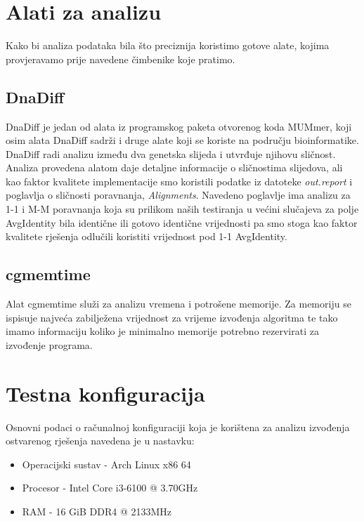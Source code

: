 \documentclass[times, utf8, seminar, numeric]{fer}
\begin{document}
\section{Alati za analizu}
Kako bi analiza podataka bila što preciznija koristimo gotove alate, kojima provjeravamo prije navedene čimbenike koje pratimo.

\subsection{DnaDiff}
DnaDiff je jedan od alata iz programskog paketa otvorenog koda MUMmer, koji osim alata DnaDiff sadrži i druge alate koji se koriste na području bioinformatike. DnaDiff radi analizu između dva genetska slijeda i utvrđuje njihovu sličnost. Analiza provedena alatom daje detaljne informacije o sličnostima slijedova, ali kao faktor kvalitete implementacije smo koristili podatke iz datoteke \emph{out.report} i poglavlja o sličnosti poravnanja, \emph{Alignments}. Navedeno poglavlje ima analizu za 1-1 i M-M poravnanja koja su prilikom naših testiranja u većini slučajeva za polje AvgIdentity bila identične ili gotovo identične vrijednosti pa smo stoga kao faktor kvalitete rješenja odlučili koristiti vrijednost pod 1-1 AvgIdentity.

\subsection{cgmemtime}
Alat cgmemtime služi za analizu vremena i potrošene memorije. Za memoriju se ispisuje najveća zabilježena vrijednost za vrijeme izvođenja algoritma te tako imamo informaciju koliko je minimalno memorije potrebno rezervirati za izvođenje programa.


\section{Testna konfiguracija}
Osnovni podaci o računalnoj konfiguraciji koja je korištena za analizu izvođenja ostvarenog rješenja navedena je u nastavku:
\renewcommand{\labelitemi}{$\bullet$}
\begin{itemize}
	\item Operacijski sustav - Arch Linux x86 64
	\item Procesor - Intel Core i3-6100 @ 3.70GHz
	\item RAM - 16 GiB DDR4 @ 2133MHz
\end{itemize}
\end{document}
